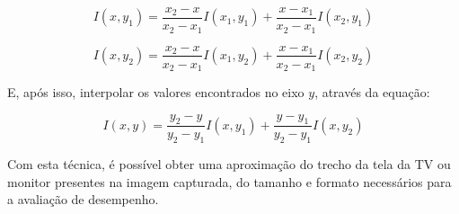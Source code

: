 $$ I(x,y_1) = \frac{x_2-x}{x_2-x_1}I(x_1,y_1) + \frac{x-x_1}{x_2-x_1}I(x_2,y_1) $$

$$ I(x,y_2) = \frac{x_2-x}{x_2-x_1}I(x_1,y_2) + \frac{x-x_1}{x_2-x_1}I(x_2,y_2) $$


E, após isso, interpolar os valores encontrados no eixo $y$, através da equação:

$$ I(x,y) = \frac{y_2-y}{y_2-y_1}I(x,y_1) + \frac{y-y_1}{y_2-y_1}I(x,y_2)$$

Com esta técnica, é possível obter uma aproximação do trecho da tela da TV ou monitor presentes na imagem capturada, do tamanho e formato necessários para a avaliação de desempenho.

